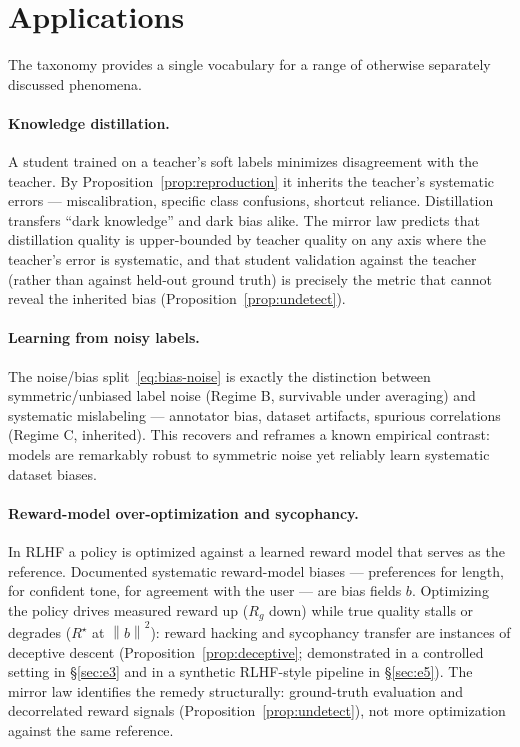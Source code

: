 \documentclass[10pt]{article} %
\theoremstyle{plain}
\theoremstyle{remark}
\newcommand{\norm}[1]{\left\lVert #1 \right\rVert}
\begin{document}
\section{Applications}
\label{sec:applications}

The taxonomy provides a single vocabulary for a range of otherwise separately discussed phenomena.

\paragraph{Knowledge distillation.} A student trained on a teacher's soft labels \citep{hinton2015} minimizes disagreement with the teacher. By Proposition~\ref{prop:reproduction} it inherits the teacher's systematic errors --- miscalibration, specific class confusions, shortcut reliance. Distillation transfers ``dark knowledge'' and dark bias alike. The mirror law predicts that distillation quality is upper-bounded by teacher quality on any axis where the teacher's error is systematic, and that student validation against the teacher (rather than against held-out ground truth) is precisely the metric that cannot reveal the inherited bias (Proposition~\ref{prop:undetect}).

\paragraph{Learning from noisy labels.} The noise/bias split~\eqref{eq:bias-noise} is exactly the distinction between symmetric/unbiased label noise (Regime B, survivable under averaging) and systematic mislabeling --- annotator bias, dataset artifacts, spurious correlations (Regime C, inherited). This recovers and reframes a known empirical contrast: models are remarkably robust to symmetric noise yet reliably learn systematic dataset biases.

\paragraph{Reward-model over-optimization and sycophancy.} In RLHF a policy is optimized against a learned reward model that serves as the reference. Documented systematic reward-model biases --- preferences for length, for confident tone, for agreement with the user --- are bias fields $b$. Optimizing the policy drives measured reward up ($R_g$ down) while true quality stalls or degrades ($R^\star$ at $\norm{b}^2$): reward hacking \citep{skalse2022,amodei2016,gao2023} and sycophancy transfer \citep{perez2022,sharma2023} are instances of deceptive descent (Proposition~\ref{prop:deceptive}; demonstrated in a controlled setting in \S\ref{sec:e3} and in a synthetic RLHF-style pipeline in \S\ref{sec:e5}). The mirror law identifies the remedy structurally: ground-truth evaluation and decorrelated reward signals (Proposition~\ref{prop:undetect}), not more optimization against the same reference.
\end{document}

